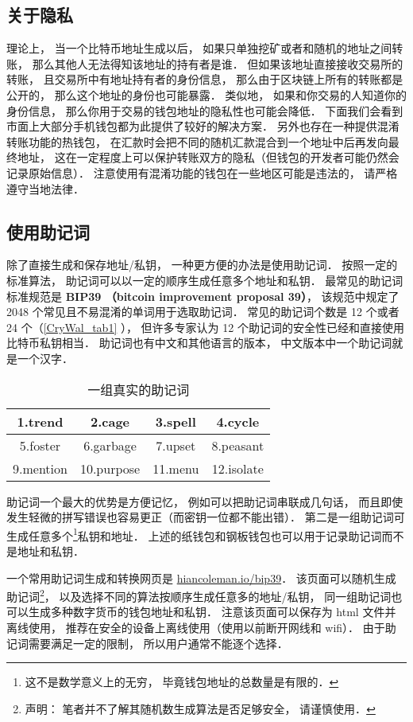 \subsection{关于隐私}
理论上， 当一个比特币地址生成以后， 如果只单独挖矿或者和随机的地址之间转账， 那么其他人无法得知该地址的持有者是谁． 但如果该地址直接接收交易所的转账， 且交易所中有地址持有者的身份信息， 那么由于区块链上所有的转账都是公开的， 那么这个地址的身份也可能暴露． 类似地， 如果和你交易的人知道你的身份信息， 那么你用于交易的钱包地址的隐私性也可能会降低． 下面我们会看到市面上大部分手机钱包都为此提供了较好的解决方案． 另外也存在一种提供混淆转账功能的热钱包， 在汇款时会把不同的随机汇款混合到一个地址中后再发向最终地址， 这在一定程度上可以保护转账双方的隐私（但钱包的开发者可能仍然会记录原始信息）． 注意使用有混淆功能的钱包在一些地区可能是违法的， 请严格遵守当地法律．

\subsection{使用助记词}
除了直接生成和保存地址/私钥， 一种更方便的办法是使用助记词． 按照一定的标准算法， 助记词可以以一定的顺序生成任意多个地址和私钥． 最常见的助记词标准规范是 \textbf{BIP39 （bitcoin improvement proposal 39）}， 该规范中规定了 2048 个常见且不易混淆的单词用于选取助记词． 常见的助记词个数是 12 个或者 24 个（\autoref{CryWal_tab1} ）， 但许多专家认为 12 个助记词的安全性已经和直接使用比特币私钥相当． 助记词也有中文和其他语言的版本， 中文版本中一个助记词就是一个汉字．
\begin{table}[ht]
\centering
\caption{一组真实的助记词}\label{CryWal_tab1}
\begin{tabular}{|c|c|c|c|}
\hline
1.trend & 2.cage & 3.spell & 4.cycle \\
\hline
5.foster & 6.garbage & 7.upset & 8.peasant \\
\hline
9.mention & 10.purpose & 11.menu & 12.isolate \\
\hline
\end{tabular}
\end{table}

助记词一个最大的优势是方便记忆， 例如可以把助记词串联成几句话， 而且即使发生轻微的拼写错误也容易更正（而密钥一位都不能出错）． 第二是一组助记词可生成任意多个\footnote{这不是数学意义上的无穷， 毕竟钱包地址的总数量是有限的．}私钥和地址． 上述的纸钱包和钢板钱包也可以用于记录助记词而不是地址和私钥．

一个常用助记词生成和转换网页是 \href{https://iancoleman.io/bip39/}{hiancoleman.io/bip39}． 该页面可以随机生成助记词\footnote{声明： 笔者并不了解其随机数生成算法是否足够安全， 请谨慎使用．}， 以及选择不同的算法按顺序生成任意多的地址/私钥， 同一组助记词也可以生成多种数字货币的钱包地址和私钥． 注意该页面可以保存为 html 文件并离线使用， 推荐在安全的设备上离线使用（使用以前断开网线和 wifi）． 由于助记词需要满足一定的限制， 所以用户通常不能逐个选择．

